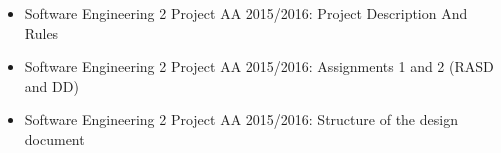 \begin{itemize}
	\item Software Engineering 2 Project AA 2015/2016: Project Description And Rules
	\item Software Engineering 2 Project AA 2015/2016: Assignments 1 and 2 (RASD and DD) 
	\item Software Engineering 2 Project AA 2015/2016: Structure of the design document
	
\end{itemize}